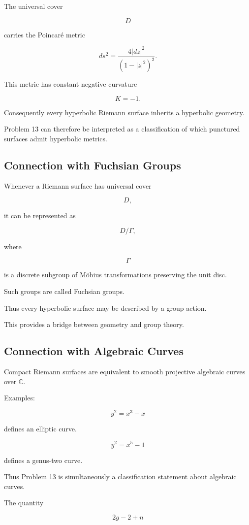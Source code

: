 \documentclass[12pt,a4paper]{article}
\theoremstyle{notespace}
\begin{document}
The universal cover

\[
D
\]

carries the Poincaré metric

\[
ds^2=
\frac{4|dz|^2}
{(1-|z|^2)^2}.
\]

This metric has constant negative curvature

\[
K=-1.
\]

Consequently every hyperbolic Riemann surface inherits a hyperbolic geometry.

Problem 13 can therefore be interpreted as a classification of which punctured surfaces admit hyperbolic metrics.

\subsection{Connection with Fuchsian Groups}

Whenever a Riemann surface has universal cover

\[
D,
\]

it can be represented as

\[
D/\Gamma,
\]

where

\[
\Gamma
\]

is a discrete subgroup of Möbius transformations preserving the unit disc.

Such groups are called Fuchsian groups.

Thus every hyperbolic surface may be described by a group action.

This provides a bridge between geometry and group theory.

\subsection{Connection with Algebraic Curves}

Compact Riemann surfaces are equivalent to smooth projective algebraic curves over \(\mathbb C\).

Examples:

\[
y^2=x^3-x
\]

defines an elliptic curve.

\[
y^2=x^5-1
\]

defines a genus-two curve.

Thus Problem 13 is simultaneously a classification statement about algebraic curves.

The quantity

\[
2g-2+n
\]
\end{document}
